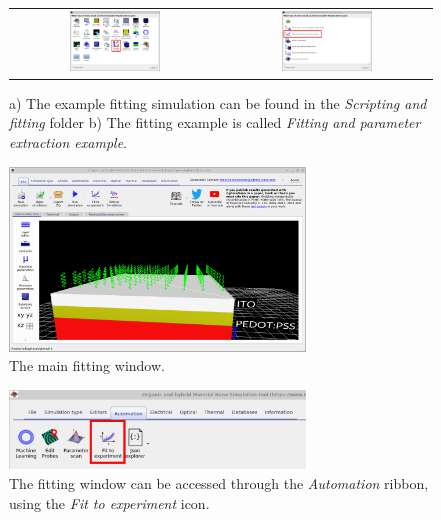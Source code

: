 \begin{figure}[H]
\centering
\begin{tabular}{ c c }

\includegraphics[width=0.45\textwidth]{./images/fit/example.png}
&
\includegraphics[width=0.45\textwidth]{./images/fit/example1.png}
\\
\end{tabular}
\caption{a) The example fitting simulation can be found in the \emph{Scripting and fitting} folder b) The fitting example is called \emph{Fitting and parameter extraction example}.}
\label{fig:fit_new_sim}
\end{figure}

\begin{figure}[H]
\centering
\includegraphics[width=0.7\textwidth]{./images/fit/main_window.png}
\caption{The main fitting window.}
\label{fig:fit_main_window}
\end{figure}

\begin{figure}[H]
\centering
\includegraphics[width=0.7\textwidth]{./images/fit/main_fit_ribbon.png}
\caption{The fitting window can be accessed through the \emph{Automation} ribbon, using the \emph{Fit to experiment} icon.}
\label{fig:fit_main_ribbon}
\end{figure}


